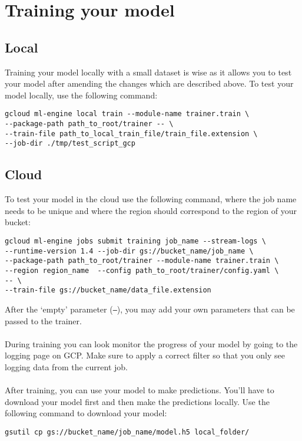 \documentclass{article}
\begin{document}
\section{Training your model}
\subsection{Local}
Training your model locally with a small dataset is wise as it allows you to test your model after amending the changes which are described above. To test your model locally, use the following command:

\begin{verbatim}
gcloud ml-engine local train --module-name trainer.train \ 
--package-path path_to_root/trainer -- \
--train-file path_to_local_train_file/train_file.extension \
--job-dir ./tmp/test_script_gcp
\end{verbatim}


\subsection{Cloud}
To test your model in the cloud use the following command, where the job name needs to be unique and where the region should correspond to the region of your bucket:
\begin{verbatim}
gcloud ml-engine jobs submit training job_name --stream-logs \
--runtime-version 1.4 --job-dir gs://bucket_name/job_name \
--package-path path_to_root/trainer --module-name trainer.train \
--region region_name  --config path_to_root/trainer/config.yaml \
-- \
--train-file gs://bucket_name/data_file.extension
\end{verbatim}
After the `empty' parameter (\texttt{--}), you may add your own parameters that can be passed to the trainer. \\
\\
During training you can look monitor the progress of your model by going to the logging page on GCP. Make sure to apply a correct filter so that you only see logging data from the current job.
\\
\\
After training, you can use your model to make predictions. You'll have to download your model first and then make the predictions locally. Use the following command to download your model:
\begin{verbatim}
gsutil cp gs://bucket_name/job_name/model.h5 local_folder/
\end{verbatim}
\end{document}
